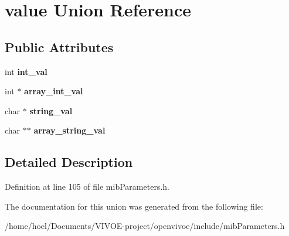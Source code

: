 \hypertarget{unionvalue}{}\section{value Union Reference}
\label{unionvalue}
\subsection*{Public Attributes}
\begin{DoxyCompactItemize}
\item 
int {\bfseries int\+\_\+val}\hypertarget{unionvalue_a229e430b304b371a89e63c231792772f}{}\label{unionvalue_a229e430b304b371a89e63c231792772f}

\item 
int $\ast$ {\bfseries array\+\_\+int\+\_\+val}\hypertarget{unionvalue_a033df89c1975130cb01085afba6770ed}{}\label{unionvalue_a033df89c1975130cb01085afba6770ed}

\item 
char $\ast$ {\bfseries string\+\_\+val}\hypertarget{unionvalue_a2cd4805f055676485bb981a1720f9111}{}\label{unionvalue_a2cd4805f055676485bb981a1720f9111}

\item 
char $\ast$$\ast$ {\bfseries array\+\_\+string\+\_\+val}\hypertarget{unionvalue_a3d7aab353b92ef162a0692b1abf8875f}{}\label{unionvalue_a3d7aab353b92ef162a0692b1abf8875f}

\end{DoxyCompactItemize}


\subsection{Detailed Description}


Definition at line 105 of file mib\+Parameters.\+h.



The documentation for this union was generated from the following file\+:\begin{DoxyCompactItemize}
\item 
/home/hoel/\+Documents/\+V\+I\+V\+O\+E-\/project/openvivoe/include/mib\+Parameters.\+h\end{DoxyCompactItemize}
